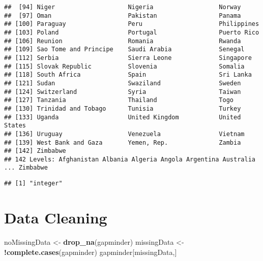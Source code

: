 \documentclass[
]{article}
\newenvironment{Shaded}{\begin{snugshade}}{\end{snugshade}}
\newcommand{\FunctionTok}[1]{\textcolor[rgb]{0.13,0.29,0.53}{\textbf{#1}}}
\newcommand{\NormalTok}[1]{#1}
\newcommand{\OtherTok}[1]{\textcolor[rgb]{0.56,0.35,0.01}{#1}}
\newcommand{\SpecialCharTok}[1]{\textcolor[rgb]{0.81,0.36,0.00}{\textbf{#1}}}
\begin{document}
\begin{verbatim}
##  [94] Niger                    Nigeria                  Norway                  
##  [97] Oman                     Pakistan                 Panama                  
## [100] Paraguay                 Peru                     Philippines             
## [103] Poland                   Portugal                 Puerto Rico             
## [106] Reunion                  Romania                  Rwanda                  
## [109] Sao Tome and Principe    Saudi Arabia             Senegal                 
## [112] Serbia                   Sierra Leone             Singapore               
## [115] Slovak Republic          Slovenia                 Somalia                 
## [118] South Africa             Spain                    Sri Lanka               
## [121] Sudan                    Swaziland                Sweden                  
## [124] Switzerland              Syria                    Taiwan                  
## [127] Tanzania                 Thailand                 Togo                    
## [130] Trinidad and Tobago      Tunisia                  Turkey                  
## [133] Uganda                   United Kingdom           United States           
## [136] Uruguay                  Venezuela                Vietnam                 
## [139] West Bank and Gaza       Yemen, Rep.              Zambia                  
## [142] Zimbabwe                
## 142 Levels: Afghanistan Albania Algeria Angola Argentina Australia ... Zimbabwe
\end{verbatim}

\begin{Shaded}
\end{Shaded}

\begin{verbatim}
## [1] "integer"
\end{verbatim}

\section{Data Cleaning}\label{data-cleaning}

\begin{Shaded}
\begin{Highlighting}[]
\NormalTok{noMissingData }\OtherTok{\textless{}{-}} \FunctionTok{drop\_na}\NormalTok{(gapminder)}
\NormalTok{missingData }\OtherTok{\textless{}{-}} \SpecialCharTok{!}\FunctionTok{complete.cases}\NormalTok{(gapminder)}
\NormalTok{gapminder[missingData,]}
\end{Highlighting}
\end{Shaded}
\end{document}
